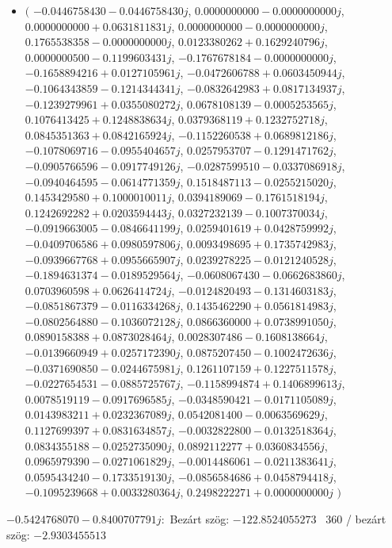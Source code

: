 \documentclass[14pt,a4paper]{article}
\begin{document}
\begin{itemize}
\item
$\big($
$-0.0446758430-0.0446758430j$, $0.0000000000-0.0000000000j$, $0.0000000000+0.0631811831j$, $0.0000000000-0.0000000000j$, $0.1765538358-0.0000000000j$, $0.0123380262+0.1629240796j$, $0.0000000500-0.1199603431j$, $-0.1767678184-0.0000000000j$, $-0.1658894216+0.0127105961j$, $-0.0472606788+0.0603450944j$, $-0.1064343859-0.1214344341j$, $-0.0832642983+0.0817134937j$, $-0.1239279961+0.0355080272j$, $0.0678108139-0.0005253565j$, $0.1076413425+0.1248838634j$, $0.0379368119+0.1232752718j$, $0.0845351363+0.0842165924j$, $-0.1152260538+0.0689812186j$, $-0.1078069716-0.0955404657j$, $0.0257953707-0.1291471762j$, $-0.0905766596-0.0917749126j$, $-0.0287599510-0.0337086918j$, $-0.0940464595-0.0614771359j$, $0.1518487113-0.0255215020j$, $0.1453429580+0.1000010011j$, $0.0394189069-0.1761518194j$, $0.1242692282+0.0203594443j$, $0.0327232139-0.1007370034j$, $-0.0919663005-0.0846641199j$, $0.0259401619+0.0428759992j$, $-0.0409706586+0.0980597806j$, $0.0093498695+0.1735742983j$, $-0.0939667768+0.0955665907j$, $0.0239278225-0.0121240528j$, $-0.1894631374-0.0189529564j$, $-0.0608067430-0.0662683860j$, $0.0703960598+0.0626414724j$, $-0.0124820493-0.1314603183j$, $-0.0851867379-0.0116334268j$, $0.1435462290+0.0561814983j$, $-0.0802564880-0.1036072128j$, $0.0866360000+0.0738991050j$, $0.0890158388+0.0873028464j$, $0.0028307486-0.1608138664j$, $-0.0139660949+0.0257172390j$, $0.0875207450-0.1002472636j$, $-0.0371690850-0.0244675981j$, $0.1261107159+0.1227511578j$, $-0.0227654531-0.0885725767j$, $-0.1158994874+0.1406899613j$, $0.0078519119-0.0917696585j$, $-0.0348590421-0.0171105089j$, $0.0143983211+0.0232367089j$, $0.0542081400-0.0063569629j$, $0.1127699397+0.0831634857j$, $-0.0032822800-0.0132518364j$, $0.0834355188-0.0252735090j$, $0.0892112277+0.0360834556j$, $0.0965979390-0.0271061829j$, $-0.0014486061-0.0211383641j$, $0.0595434240-0.1733519130j$, $-0.0856584686+0.0458794418j$, $-0.1095239668+0.0033280364j$, $0.2498222271+0.0000000000j$
$\big)$
\end{itemize}
$-0.5424768070-0.8400707791j$:\
Bezárt szög: $-122.8524055273$ \
360 / bezárt szög: $-2.9303455513$\
\end{document}

